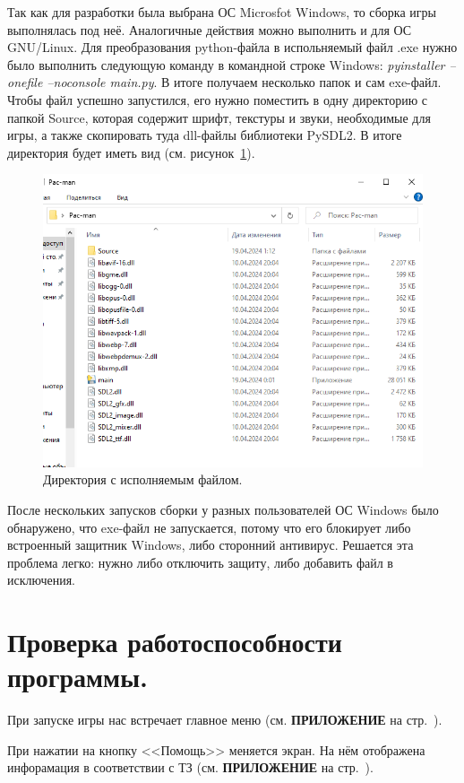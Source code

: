Так как для разработки была выбрана ОС Microsfot Windows, то сборка игры выполнялась под неё. Аналогичные действия можно выполнить и для ОС GNU/Linux.
Для преобразования python-файла в испольняемый файл .exe нужно было выполнить следующую команду в командной строке Windows: \textsl{pyinstaller --onefile --noconsole main.py}. В итоге получаем несколько папок и сам exe-файл. Чтобы файл успешно запустился, его нужно поместить в одну директорию с папкой Source, которая содержит шрифт, текстуры и звуки, необходимые для игры, а также скопировать туда dll-файлы библиотеки PySDL2. В итоге директория будет иметь вид (см. рисунок~\ref{fig9}).
\begin{figure}[H]
	\centering
	\includegraphics[width=1\linewidth]{images/dir.png}
	\caption{Директория с исполняемым файлом.}
	\label{fig9}
\end{figure}
После нескольких запусков сборки у разных пользователей ОС Windows было обнаружено, что exe-файл не запускается, потому что его блокирует либо встроенный защитник Windows, либо сторонний антивирус. Решается эта проблема легко: нужно либо отключить защиту, либо добавить файл в исключения.

\section{\label{sec:ch02/sec01/sub10}Проверка работоспособности программы.}
При запуске игры нас встречает главное меню (см. \textbf{\textsc{ПРИЛОЖЕНИЕ}} на стр.~\pageref{fig2}).

При нажатии на кнопку <<Помощь>> меняется экран. На нём отображена инфорамация в соответствии с ТЗ (см. \textbf{\textsc{ПРИЛОЖЕНИЕ}} на стр.~\pageref{fig3}).

